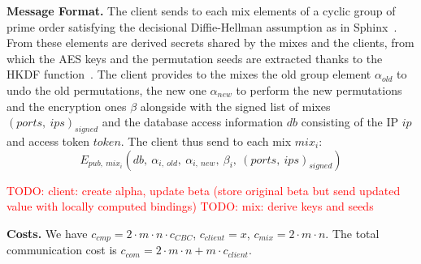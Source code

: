 \documentclass[USenglish,oneside,twocolumn]{article}
\newcommand{\todo}[1]{\textcolor{red}{TODO: #1}}
\begin{document}
\noindent\textbf{Message Format.}
The client sends to each mix elements of a cyclic group of prime order satisfying the decisional Diffie-Hellman assumption as in Sphinx~\cite{danezis2009sphinx}. From these elements are derived secrets shared by the mixes and the clients, from which the AES keys and the permutation seeds are extracted thanks to the HKDF function~\cite{krawczyk2010cryptographic}.
The client provides to the mixes the old group element $\alpha_{old}$ to undo the old permutations, the new one $\alpha_{new}$ to perform the new permutations and the encryption ones $\beta$ alongside with the signed list of mixes $(ports,\ ips)_{signed}$ and the database access information $db$ consisting of the IP $ip$ and access token $token$. The client thus send to each mix $mix_i$:
$$E_{pub,\ mix_i}\left ( db,\ \alpha_{i,\ old},\ \alpha_{i,\ new},\ \beta_{i},\ (ports,\ ips)_{signed} \right) $$

\todo{client: create alpha, update beta (store original beta but send updated value with locally computed bindings)}
\todo{mix: derive keys and seeds}

\noindent\textbf{Costs.}
We have $c_{cmp} = 2\cdot m \cdot n \cdot c_{CBC}$, $c_{client}= x$, $c_{mix}=2\cdot m \cdot n$. The total communication cost is $c_{com}=2\cdot m\cdot n + m\cdot c_{client}$.\\
\end{document}
